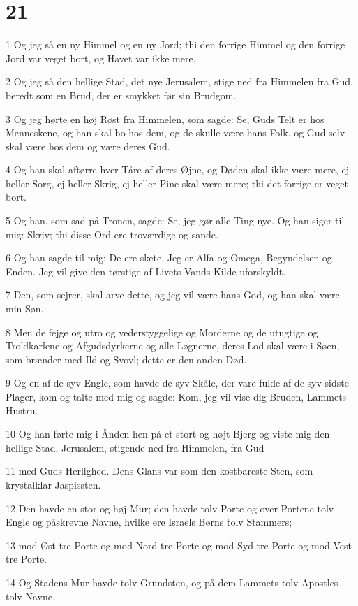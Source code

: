\chapter{21}

\par 1 Og jeg så en ny Himmel og en ny Jord; thi den forrige Himmel og den forrige Jord var veget bort, og Havet var ikke mere.
\par 2 Og jeg så den hellige Stad, det nye Jerusalem, stige ned fra Himmelen fra Gud, beredt som en Brud, der er smykket før sin Brudgom.
\par 3 Og jeg hørte en høj Røst fra Himmelen, som sagde: Se, Guds Telt er hos Menneskene, og han skal bo hos dem, og de skulle være hans Folk, og Gud selv skal være hos dem og være deres Gud.
\par 4 Og han skal aftørre hver Tåre af deres Øjne, og Døden skal ikke være mere, ej heller Sorg, ej heller Skrig, ej heller Pine skal være mere; thi det forrige er veget bort.
\par 5 Og han, som sad på Tronen, sagde: Se, jeg gør alle Ting nye. Og han siger til mig: Skriv; thi disse Ord ere troværdige og sande.
\par 6 Og han sagde til mig: De ere skete. Jeg er Alfa og Omega, Begyndelsen og Enden. Jeg vil give den tørstige af Livets Vands Kilde uforskyldt.
\par 7 Den, som sejrer, skal arve dette, og jeg vil være hans God, og han skal være min Søn.
\par 8 Men de fejge og utro og vederstyggelige og Morderne og de utugtige og Troldkarlene og Afgudsdyrkerne og alle Løgnerne, deres Lod skal være i Søen, som brænder med Ild og Svovl; dette er den anden Død.
\par 9 Og en af de syv Engle, som havde de syv Skåle, der vare fulde af de syv sidste Plager, kom og talte med mig og sagde: Kom, jeg vil vise dig Bruden, Lammets Hustru.
\par 10 Og han førte mig i Ånden hen på et stort og højt Bjerg og viste mig den hellige Stad, Jerusalem, stigende ned fra Himmelen, fra Gud
\par 11 med Guds Herlighed. Dens Glans var som den kostbareste Sten, som krystalklar Jaspissten.
\par 12 Den havde en stor og høj Mur; den havde tolv Porte og over Portene tolv Engle og påskrevne Navne, hvilke ere Israels Børns tolv Stammers;
\par 13 mod Øst tre Porte og mod Nord tre Porte og mod Syd tre Porte og mod Vest tre Porte.
\par 14 Og Stadens Mur havde tolv Grundsten, og på dem Lammets tolv Apostles tolv Navne.
